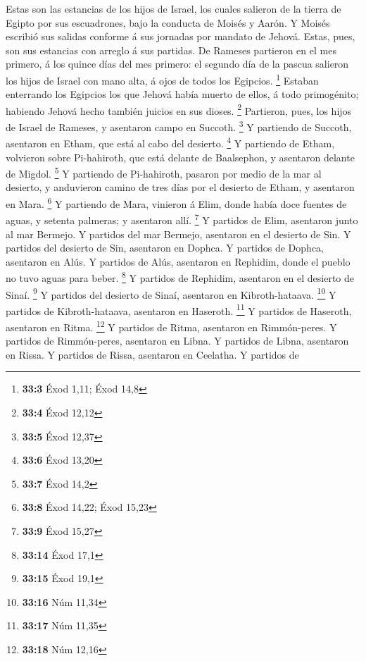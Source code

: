  Estas son las estancias de los hijos de Israel, los cuales
salieron de la tierra de Egipto por sus escuadrones, bajo la conducta de
Moisés y Aarón.  Y Moisés escribió sus salidas conforme á
sus jornadas por mandato de Jehová. Estas, pues, son sus estancias con
arreglo á sus partidas.  De Rameses partieron en el mes
primero, á los quince días del mes primero: el segundo día de la pascua
salieron los hijos de Israel con mano alta, á ojos de todos los
Egipcios. \footnote{\textbf{33:3} Éxod 1,11; Éxod 14,8} 
Estaban enterrando los Egipcios los que Jehová había muerto de ellos, á
todo primogénito; habiendo Jehová hecho también juicios en sus dioses.
\footnote{\textbf{33:4} Éxod 12,12}  Partieron, pues, los
hijos de Israel de Rameses, y asentaron campo en Succoth. \footnote{\textbf{33:5}
  Éxod 12,37}  Y partiendo de Succoth, asentaron en Etham,
que está al cabo del desierto. \footnote{\textbf{33:6} Éxod 13,20}
 Y partiendo de Etham, volvieron sobre Pi-hahiroth, que está
delante de Baalsephon, y asentaron delante de Migdol. \footnote{\textbf{33:7}
  Éxod 14,2}  Y partiendo de Pi-hahiroth, pasaron por medio
de la mar al desierto, y anduvieron camino de tres días por el desierto
de Etham, y asentaron en Mara. \footnote{\textbf{33:8} Éxod 14,22; Éxod
  15,23}  Y partiendo de Mara, vinieron á Elim, donde había
doce fuentes de aguas, y setenta palmeras; y asentaron allí. \footnote{\textbf{33:9}
  Éxod 15,27}  Y partidos de Elim, asentaron junto al mar
Bermejo.  Y partidos del mar Bermejo, asentaron en el
desierto de Sin.  Y partidos del desierto de Sin, asentaron
en Dophca.  Y partidos de Dophca, asentaron en Alús.
 Y partidos de Alús, asentaron en Rephidim, donde el pueblo
no tuvo aguas para beber. \footnote{\textbf{33:14} Éxod 17,1}
 Y partidos de Rephidim, asentaron en el desierto de Sinaí.
\footnote{\textbf{33:15} Éxod 19,1}  Y partidos del
desierto de Sinaí, asentaron en Kibroth-hataava. \footnote{\textbf{33:16}
  Núm 11,34}  Y partidos de Kibroth-hataava, asentaron en
Haseroth. \footnote{\textbf{33:17} Núm 11,35}  Y partidos
de Haseroth, asentaron en Ritma. \footnote{\textbf{33:18} Núm 12,16}
 Y partidos de Ritma, asentaron en Rimmón-peres.
 Y partidos de Rimmón-peres, asentaron en Libna.
 Y partidos de Libna, asentaron en Rissa.  Y
partidos de Rissa, asentaron en Ceelatha.  Y partidos de
